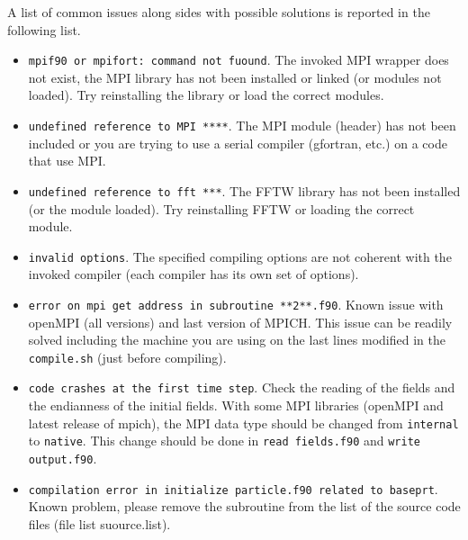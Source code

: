 A list of common issues along sides with possible solutions is reported in the following list.
\begin{itemize}
\item \texttt{mpif90 or mpifort: command not fuound}. The invoked MPI wrapper does not exist, the MPI library has not been installed or linked (or modules not loaded). Try reinstalling the library or load the correct modules. 
\item \texttt{undefined reference to MPI ****}. The MPI module (header) has not been included or you are trying to use a serial compiler (gfortran, etc.) on a code that use MPI.
\item \texttt{undefined reference to fft ***}. The FFTW library has not been installed (or the module loaded). Try reinstalling FFTW or loading the correct module.
\item \texttt{invalid options}. The specified compiling options are not coherent with the invoked compiler (each compiler has its own set of options).
\item \texttt{error on mpi get address in subroutine **2**.f90}. Known issue with openMPI (all versions) and last version of MPICH. This issue can be readily solved including the machine you are using on the last lines modified in the \texttt{compile.sh} (just before compiling).
\item \texttt{code crashes at the first time step}. Check the reading of the fields and the endianness of the initial fields. With some MPI libraries (openMPI and latest release of mpich), the MPI data type should be changed from \texttt{internal} to \texttt{native}. This change should be done in \texttt{read fields.f90} and \texttt{write output.f90}.
\item \texttt{compilation error in initialize particle.f90 related to baseprt}. Known problem, please remove the subroutine from the list of the source code files (file list suource.list).
\end{itemize}



